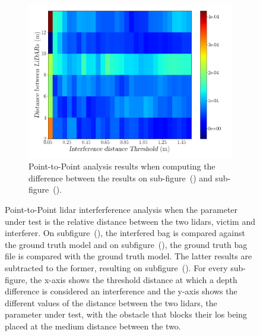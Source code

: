 \begin{figure}[!ht]
\begin{subfigure}[c]{0.45\textwidth}
		\label{fig:los:ground-truth-color-mesh}
	\end{subfigure}
	\\ \vspace{4mm}
	\begin{subfigure}[c]{0.8\textwidth}
		\includegraphics[width=\textwidth]{img/lidar-interference/LOS/difference_ground_truth_interference_measurement.png}
		\caption{Point-to-Point analysis results when computing the difference between the results on sub-figure~() and sub-figure~().}
		\label{fig:los:difference-color-mesh}
	\end{subfigure}

	\caption{Point-to-Point \ac{lidar} interferference analysis when the parameter under test is the relative distance between the two \acp{lidar}, victim and interferer. On subfigure~(), the interfered bag is compared against the ground truth model and on subfigure~(), the ground truth bag file is compared with the ground truth model. The latter results are subtracted to the former, resulting on subfigure~(). For every sub-figure, the x-axis shows the threshold distance at which a depth difference is considered an interference and the y-axis shows the different values of the distance between the two \acp{lidar}, the parameter under test, with the obstacle that blocks their \ac{los} being placed at the medium distance between the two.}
	\label{fig:los:color-mesh}
\end{figure}

